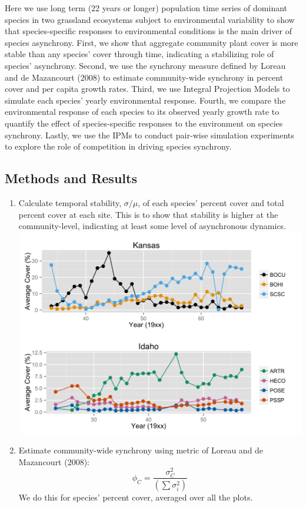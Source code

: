 \documentclass[12pt,]{article}
\begin{document}
Here we use long term (22 years or longer) population time series of
dominant species in two grassland ecosystems subject to environmental
variability to show that species-specific responses to environmental
conditions is the main driver of species asynchrony. First, we show that
aggregate community plant cover is more stable than any species' cover
through time, indicating a stabilizing role of species' asynchrony.
Second, we use the synchrony measure defined by Loreau and de Mazancourt
(2008) to estimate community-wide synchrony in percent cover and per
capita growth rates. Third, we use Integral Projection Models to
simulate each species' yearly environmental response. Fourth, we compare
the environmental response of each species to its observed yearly growth
rate to quantify the effect of species-specific responses to the
environment on species synchrony. Lastly, we use the IPMs to conduct
pair-wise simulation experiments to explore the role of competition in
driving species synchrony.

\subsection{Methods and Results}\label{methods-and-results}

\begin{enumerate}
\def\labelenumi{\arabic{enumi}.}
\item
  Calculate temporal stability, $\sigma/\mu$, of each species' percent
  cover and total percent cover at each site. This is to show that
  stability is higher at the community-level, indicating at least some
  level of asynchronous dynamics.
  \includegraphics{components/figure/manuscript-figure_1.pdf}
\item
  Estimate community-wide synchrony using metric of Loreau and de
  Mazancourt (2008): \[
  \phi_{C} = \frac{\sigma_{C}^2}{(\sum\sigma_{i}^2)}
  \] We do this for species' percent cover, averaged over all the plots.
\end{enumerate}
\end{document}
